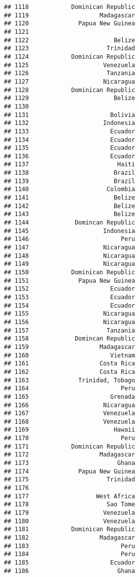 \documentclass[
]{article}
\begin{document}
\begin{verbatim}
## 1118            Dominican Republic
## 1119                    Madagascar
## 1120              Papua New Guinea
## 1121                              
## 1122                        Belize
## 1123                      Trinidad
## 1124            Dominican Republic
## 1125                     Venezuela
## 1126                      Tanzania
## 1127                     Nicaragua
## 1128            Dominican Republic
## 1129                        Belize
## 1130                              
## 1131                       Bolivia
## 1132                     Indonesia
## 1133                       Ecuador
## 1134                       Ecuador
## 1135                       Ecuador
## 1136                       Ecuador
## 1137                         Haiti
## 1138                        Brazil
## 1139                        Brazil
## 1140                      Colombia
## 1141                        Belize
## 1142                        Belize
## 1143                        Belize
## 1144             Domincan Republic
## 1145                     Indonesia
## 1146                          Peru
## 1147                     Nicaragua
## 1148                     Nicaragua
## 1149                     Nicaragua
## 1150            Dominican Republic
## 1151              Papua New Guinea
## 1152                       Ecuador
## 1153                       Ecuador
## 1154                       Ecuador
## 1155                     Nicaragua
## 1156                     Nicaragua
## 1157                      Tanzania
## 1158             Domincan Republic
## 1159                    Madagascar
## 1160                       Vietnam
## 1161                    Costa Rica
## 1162                    Costa Rica
## 1163              Trinidad, Tobago
## 1164                          Peru
## 1165                       Grenada
## 1166                     Nicaragua
## 1167                     Venezuela
## 1168                     Venezuela
## 1169                        Hawaii
## 1170                          Peru
## 1171            Dominican Republic
## 1172                    Madagascar
## 1173                         Ghana
## 1174              Papua New Guinea
## 1175                      Trinidad
## 1176                              
## 1177                   West Africa
## 1178                      Sao Tome
## 1179                     Venezuela
## 1180                     Venezuela
## 1181            Dominican Republic
## 1182                    Madagascar
## 1183                          Peru
## 1184                          Peru
## 1185                       Ecuador
## 1186                         Ghana

\end{verbatim}
\end{document}
